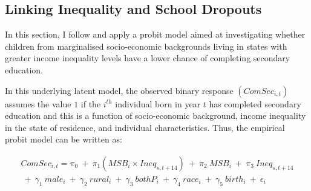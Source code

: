 \documentclass[a4paper, 12pt]{article}
\begin{document}
\subsection{Linking Inequality and School Dropouts}
\label{Dropout-Model}




In this section, I follow \citet{kearney2014income} and apply a probit model aimed at investigating whether children from marginalised socio-economic backgrounds living in states with greater income inequality levels have a lower chance of completing secondary education. 

In this underlying latent model, the observed binary response $(ComSec_{i,t})$ assumes the value $1$ if the $i^{th}$ individual born in year $t$ has completed secondary education and this is a function of socio-economic background, income inequality in the state of residence, and individual characteristics. Thus, the empirical probit model can be written as:


\begin{equation} \label{eq:EduOutcome}
\begin{split}
ComSec_{i,t}=\pi_0 \:+\: \pi_1 \left(MSB_{i} \times Ineq_{s,t+14} \right) \:+\: \pi_2 \: MSB_{i}  \:+\: \pi_3 \: Ineq_{s,t+14} \\ \:+\: \gamma_1 \: male_{i} \:+\: \gamma_2 \: rural_{i} \:+\: \gamma_3 \: bothP_{i} \:+\: \gamma_4 \: race_{i} \:+\: \gamma_5 \: birth_{i} \:+\: \epsilon_{i} 
\end{split}
\end{equation}


\end{document}
